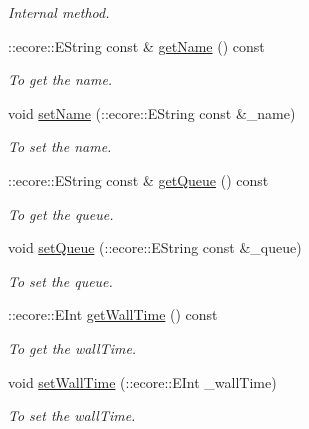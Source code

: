 \begin{DoxyCompactItemize}
\begin{DoxyCompactList}\small\item\em Internal method. \item\end{DoxyCompactList}\item 
::ecore::EString const \& \hyperlink{classTMS__Data_1_1SubmitOptions_a22323bcb72fdd84dc93419b4b2dcda44}{getName} () const 
\begin{DoxyCompactList}\small\item\em To get the name. \item\end{DoxyCompactList}\item 
void \hyperlink{classTMS__Data_1_1SubmitOptions_a2a7118b64bde24224ab7fe1e57c7a0bf}{setName} (::ecore::EString const \&\_\-name)
\begin{DoxyCompactList}\small\item\em To set the name. \item\end{DoxyCompactList}\item 
::ecore::EString const \& \hyperlink{classTMS__Data_1_1SubmitOptions_ac7d8271c4d2f3315662ade281e6c4622}{getQueue} () const 
\begin{DoxyCompactList}\small\item\em To get the queue. \item\end{DoxyCompactList}\item 
void \hyperlink{classTMS__Data_1_1SubmitOptions_a27d625c4040552f4272c6f6cb365ead7}{setQueue} (::ecore::EString const \&\_\-queue)
\begin{DoxyCompactList}\small\item\em To set the queue. \item\end{DoxyCompactList}\item 
::ecore::EInt \hyperlink{classTMS__Data_1_1SubmitOptions_abb539250d44bafda09a5a49306ec1666}{getWallTime} () const 
\begin{DoxyCompactList}\small\item\em To get the wallTime. \item\end{DoxyCompactList}\item 
void \hyperlink{classTMS__Data_1_1SubmitOptions_a94c5494903c5e25fc3d61d4a0bda46b3}{setWallTime} (::ecore::EInt \_\-wallTime)
\begin{DoxyCompactList}\small\item\em To set the wallTime. \item\end{DoxyCompactList}\item 

\end{DoxyCompactItemize}
